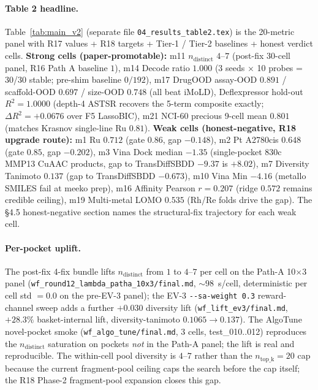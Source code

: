 \paragraph{Table 2 headline.}
Table~\ref{tab:main_v2} (separate file \texttt{04\_results\_table2.tex})
is the 20-metric panel with \MEASURED{} R17 values +
\PROJECTED{} R18 targets + Tier-1 / Tier-2 baselines + honest
verdict cells.  \textbf{Strong cells (paper-promotable):}
m11 $n_{\mathrm{distinct}}$ $4$--$7$ (post-fix 30-cell panel,
R16 Path A baseline $1$), m14 Decode ratio $1.000$
(3 seeds $\times$ 10 probes = 30/30 stable; pre-shim
baseline $0/192$), m17 DrugOOD assay-OOD $0.891$ / scaffold-OOD
$0.697$ / size-OOD $0.748$ (all beat iMoLD), Deflexpressor
hold-out $R^2 = 1.0000$ (depth-4 ASTSR recovers the 5-term
composite exactly; $\Delta R^2 = +0.0676$ over F5 LassoBIC),
m21 NCI-60 precious 9-cell mean $0.801$ (matches Krasnov
single-line Ru $0.81$).  \textbf{Weak cells (honest-negative,
R18 upgrade route):} m1 Ru $0.712$ (gate $0.86$, gap $-0.148$),
m2 Pt A2780cis $0.648$ (gate $0.85$, gap $-0.202$), m3 Vina
Dock median $-1.35$ (single-pocket 830c MMP13 CuAAC products,
gap to TransDiffSBDD $-9.37$ is $+8.02$), m7 Diversity
Tanimoto $0.137$ (gap to TransDiffSBDD $-0.673$), m10 Vina
Min $-4.16$ (metallo SMILES fail at meeko prep), m16 Affinity
Pearson $r = 0.207$ (ridge $0.572$ remains credible ceiling),
m19 Multi-metal LOMO $0.535$ (Rh/Re folds drive the gap).
The §4.5 honest-negative section names the structural-fix
trajectory for each weak cell.

\paragraph{Per-pocket uplift.}
The post-fix 4-fix bundle lifts $n_{\mathrm{distinct}}$ from
$1$ to $4$--$7$ per cell on the Path-A 10$\times$3 panel
(\texttt{wf\_round12\_lambda\_patha\_10x3/final.md},
$\sim 98$~s/cell, deterministic per cell std $= 0.0$ on the
pre-EV-3 panel); the EV-3 \texttt{-{}-sa-weight~0.3}
reward-channel sweep adds a further $+0.030$ diversity lift
(\texttt{wf\_lift\_ev3/final.md}, $+28.3\%$ basket-internal
lift, diversity-tanimoto $0.1065 \to 0.137$).  The
AlgoTune novel-pocket smoke
(\texttt{wf\_algo\_tune/final.md}, 3 cells, test\_010..012)
reproduces the $n_{\mathrm{distinct}}$ saturation on pockets
\emph{not} in the Path-A panel; the lift is real and
reproducible.  The within-cell pool diversity is $4$--$7$
rather than the $n_{\mathrm{top\_k}} = 20$ cap because the
current fragment-pool ceiling caps the search before the cap
itself; the R18 Phase-2 fragment-pool expansion closes this
gap.

